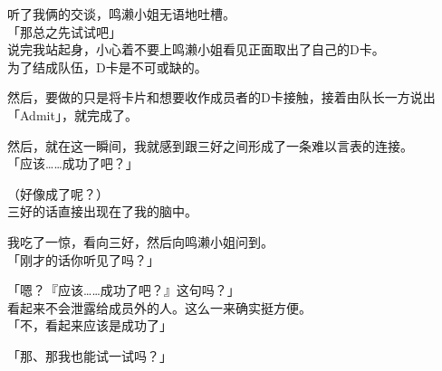 听了我俩的交谈，鸣濑小姐无语地吐槽。\\

「那总之先试试吧」\\

说完我站起身，小心着不要上鸣濑小姐看见正面取出了自己的D卡。\\

为了结成队伍，D卡是不可或缺的。

然后，要做的只是将卡片和想要收作成员者的D卡接触，接着由队长一方说出「Admit」，就完成了。

然后，就在这一瞬间，我就感到跟三好之间形成了一条难以言表的连接。\\

「应该……成功了吧？」

（好像成了呢？）\\

三好的话直接出现在了我的脑中。

我吃了一惊，看向三好，然后向鸣濑小姐问到。\\

「刚才的话你听见了吗？」

「嗯？『应该……成功了吧？』这句吗？」\\

看起来不会泄露给成员外的人。这么一来确实挺方便。\\

「不，看起来应该是成功了」

「那、那我也能试一试吗？」

